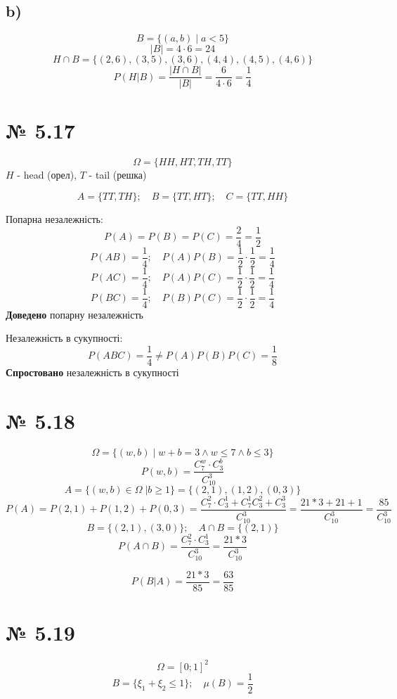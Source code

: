 \documentclass[11pt, a4paper]{article} %
\begin{document}
\subsection*{b)}
$$B = \{(a,b) \;|\; a < 5\}$$
$$|B| = 4 \cdot 6 = 24$$
$$H \cap B = \{(2,6), (3,5), (3,6), (4,4), (4,5), (4,6)\}$$
$$P(H|B) = \frac{|H\cap B|}{|B|} = \frac{6}{4 \cdot 6} = \frac{1}{4}$$


\section*{№ 5.17}
$$\Omega = \{HH, HT, TH, TT\}$$
$H$ - head (орел), $T$ - tail (решка)

$$A = \{TT, TH\};\quad B = \{TT, HT\};\quad C = \{TT, HH\}$$

Попарна незалежність:
$$P(A) = P(B) = P(C) = \frac{2}{4} = \frac{1}{2}$$
$$P(AB) = \frac{1}{4};\quad P(A)P(B) = \frac{1}{2} \cdot \frac{1}{2} = \frac{1}{4}$$
$$P(AC) = \frac{1}{4};\quad P(A)P(C) = \frac{1}{2} \cdot \frac{1}{2} = \frac{1}{4}$$
$$P(BC) = \frac{1}{4};\quad P(B)P(C) = \frac{1}{2} \cdot \frac{1}{2} = \frac{1}{4}$$
\textbf{Доведено} попарну незалежність \qedsymbol

Незалежність в сукупності:
$$P(ABC) = \frac{1}{4} \ne P(A)P(B)P(C) = \frac{1}{8}$$
\textbf{Спростовано} незалежність в сукупності

\section*{№ 5.18}
$$\Omega = \{(w,b) \;|\; w+b = 3 \wedge w\le 7 \wedge b \le 3\}$$
$$P(w,b) = \frac{C_7^w \cdot C_3^b}{C_{10}^3}$$
$$A = \{(w,b) \in \Omega \;| b\ge 1 \} = \{(2,1), (1,2), (0,3)\}$$
$$P(A) = P(2,1) + P(1,2) + P(0,3) = \frac{C_7^2 \cdot C_3^1 + C_7^1 C_3^2+C_3^3}{C_{10}^3}
= \frac{21*3 + 21 + 1}{C_{10}^3} = \frac{85}{C_{10}^3}$$
$$B = \{(2,1), (3,0)\};\quad A\cap B = \{(2,1)\}$$
$$P(A\cap B) = \frac{C_7^2 \cdot C_3^1}{C_{10}^3} = \frac{21*3}{C_{10}^3}$$

$$P(B|A) = \frac{21*3}{85} = \frac{63}{85}$$

\section*{№ 5.19}
$$\Omega = [0;1]^2$$
$$B = \{\xi_1 + \xi_2 \le 1\};\quad \mu(B) = \frac{1}{2}$$
\end{document}
